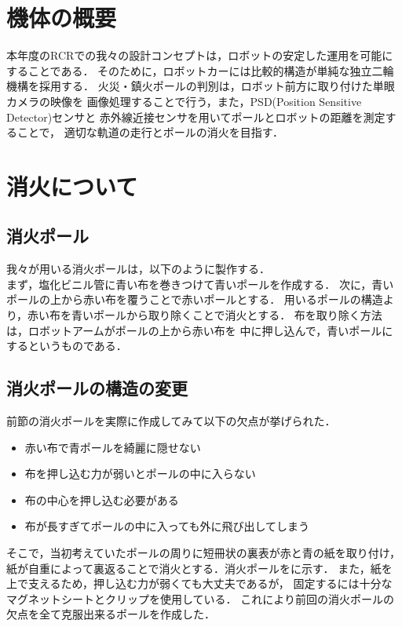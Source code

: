 \documentclass[11pt,a4]{jsarticle}
\begin{document}

\section{機体の概要}  %

  本年度のRCRでの我々の設計コンセプトは，ロボットの安定した運用を可能にすることである．
  そのために，ロボットカーには比較的構造が単純な独立二輪機構を採用する．
  火災・鎮火ポールの判別は，ロボット前方に取り付けた単眼カメラの映像を
  画像処理することで行う，また，PSD(Position Sensitive Detector)センサと
  赤外線近接センサを用いてポールとロボットの距離を測定することで，
  適切な軌道の走行とポールの消火を目指す．

\section{消火について} 

  \subsection{消火ポール}
    我々が用いる消火ポールは，以下のように製作する．\\
    まず，塩化ビニル管に青い布を巻きつけて青いポールを作成する．
    次に，青いポールの上から赤い布を覆うことで赤いポールとする．
    用いるポールの構造より，赤い布を青いポールから取り除くことで消火とする．
    布を取り除く方法は，ロボットアームがポールの上から赤い布を
    中に押し込んで，青いポールにするというものである．

  \subsection{消火ポールの構造の変更}
    前節の消火ポールを実際に作成してみて以下の欠点が挙げられた．
    \begin{itemize}
     \item 	赤い布で青ポールを綺麗に隠せない
     \item  布を押し込む力が弱いとポールの中に入らない
     \item  布の中心を押し込む必要がある
     \item  布が長すぎてポールの中に入っても外に飛び出してしまう
    \end{itemize}
    そこで，当初考えていたポールの周りに短冊状の裏表が赤と青の紙を取り付け，
    紙が自重によって裏返ることで消火とする．消火ポールをに示す．
    また，紙を上で支えるため，押し込む力が弱くても大丈夫であるが，
    固定するには十分なマグネットシートとクリップを使用している．
    これにより前回の消火ポールの欠点を全て克服出来るポールを作成した．
\end{document}

